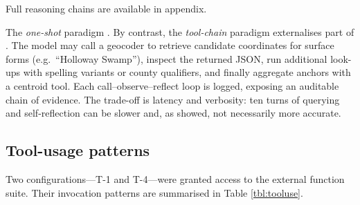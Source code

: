 Full reasoning chains are available in appendix.

The \emph{one-shot} paradigm \DIFdelbegin {}\DIFdelend \DIFaddbegin {}\DIFaddend . By contrast, the
\emph{tool-chain} paradigm externalises part of \DIFdelbegin {}\DIFdelend \DIFaddbegin {}\DIFaddend . The
model may call a geocoder to retrieve candidate coordinates for surface
forms (e.g.~``Holloway Swamp''), inspect the returned JSON, run
additional look-ups with spelling variants or county qualifiers, and
finally aggregate anchors with a centroid tool. Each
call--observe--reflect loop is logged, exposing an auditable chain of
evidence. The trade-off is latency and verbosity: ten turns of querying
and self-reflection can be slower and, as \DIFdelbegin {}\DIFdelend \DIFaddbegin {} showed, not
necessarily more accurate.

\subsection{Tool-usage patterns}\label{tool-usage-patterns}

Two configurations---T-1 and T-4---were granted access to the external
function suite. Their invocation patterns are summarised in Table
\ref{tbl:tooluse}.


